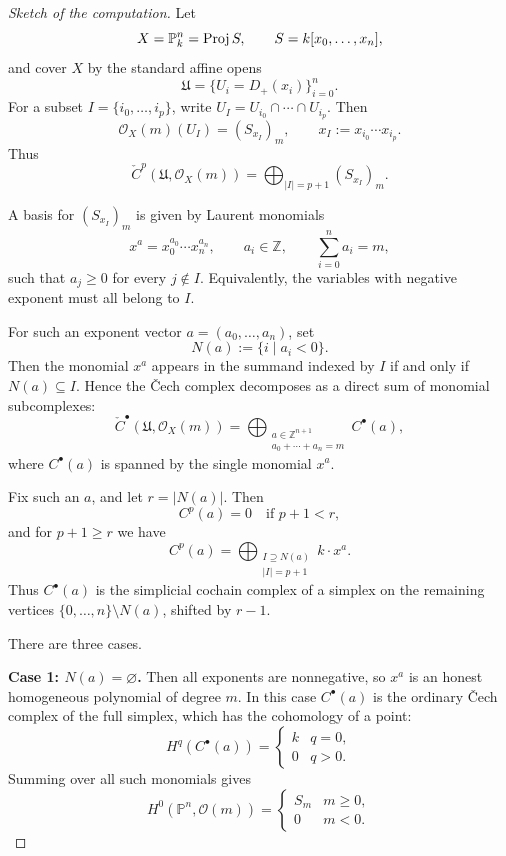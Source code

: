 \documentclass[12pt]{article}
\begin{document}
\begin{proof}[Sketch of the computation]
    Let
    \[
        X=\mathbb P^n_k=\operatorname{Proj} S, \qquad S=k[x_0,\dots,x_n],
    \]
    and cover \(X\) by the standard affine opens
    \[
        \mathfrak U=\{U_i=D_+(x_i)\}_{i=0}^n.
    \]
    For a subset \(I=\{i_0,\dots,i_p\}\), write \(U_I=U_{i_0}\cap \cdots \cap U_{i_p}\). Then
    \[
        \mathcal O_X(m)(U_I)=(S_{x_I})_m,
        \qquad x_I:=x_{i_0}\cdots x_{i_p}.
    \]
    Thus
    \[
        \check C^p(\mathfrak U,\mathcal O_X(m))
        =
        \bigoplus_{|I|=p+1}(S_{x_I})_m.
    \]

    A basis for \((S_{x_I})_m\) is given by Laurent monomials
    \[
        x^a=x_0^{a_0}\cdots x_n^{a_n},
        \qquad a_i\in \mathbb Z, \qquad \sum_{i=0}^n a_i=m,
    \]
    such that \(a_j\ge 0\) for every \(j\notin I\). Equivalently, the variables with negative exponent must all belong to \(I\).

    For such an exponent vector \(a=(a_0,\dots,a_n)\), set
    \[
        N(a):=\{i\mid a_i<0\}.
    \]
    Then the monomial \(x^a\) appears in the summand indexed by \(I\) if and only if \(N(a)\subseteq I\). Hence the Čech complex decomposes as a direct sum of monomial subcomplexes:
    \[
        \check C^\bullet(\mathfrak U,\mathcal O_X(m))
        =
        \bigoplus_{\substack{a\in \mathbb Z^{n+1}\\ a_0+\cdots+a_n=m}} C^\bullet(a),
    \]
    where \(C^\bullet(a)\) is spanned by the single monomial \(x^a\).

    Fix such an \(a\), and let \(r=|N(a)|\). Then
    \[
        C^p(a)=0 \quad \text{if } p+1<r,
    \]
    and for \(p+1\ge r\) we have
    \[
        C^p(a)=
        \bigoplus_{\substack{I\supseteq N(a)\\ |I|=p+1}} k\cdot x^a.
    \]
    Thus \(C^\bullet(a)\) is the simplicial cochain complex of a simplex on the remaining vertices \(\{0,\dots,n\}\setminus N(a)\), shifted by \(r-1\).

    There are three cases.

    \medskip

    \noindent\textbf{Case 1: \(N(a)=\varnothing\).}
    Then all exponents are nonnegative, so \(x^a\) is an honest homogeneous polynomial of degree \(m\). In this case \(C^\bullet(a)\) is the ordinary Čech complex of the full simplex, which has the cohomology of a point:
    \[
        H^q(C^\bullet(a))=
        \begin{cases}
            k & q=0, \\
            0 & q>0.
        \end{cases}
    \]
    Summing over all such monomials gives
    \[
        H^0(\mathbb P^n,\mathcal O(m))=
        \begin{cases}
            S_m & m\ge 0, \\
            0   & m<0.
        \end{cases}
    \]


\end{proof}
\end{document}
